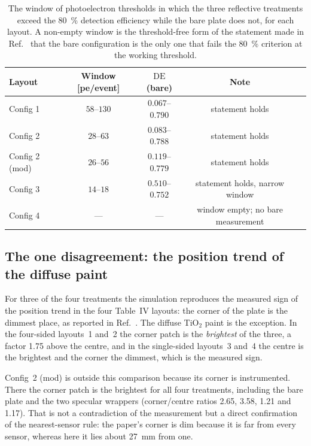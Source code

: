 \documentclass[11pt,a4paper]{article}
\begin{document}
\begin{table}[H]
\centering
\caption{The window of photoelectron thresholds in which the three reflective
treatments exceed the \SI{80}{\percent} detection efficiency while the bare
plate does not, for each layout. A non-empty window is the
threshold-free form of the statement made in Ref.~\cite{Rao2025} that the bare
configuration is the only one that fails the \SI{80}{\percent} criterion at the
working threshold.}
\label{tab:compareDE}
\small
{}
\begin{tabularx}{\textwidth}{@{}lcccY@{}}
\toprule
Layout & Window [pe/event] & $\mathrm{DE}$(bare) & Note \\
\midrule
Config 1 & $58$--$130$ & $0.067$--$0.790$ & statement holds \\
Config 2 & $28$--$63$  & $0.083$--$0.788$ & statement holds \\
Config 2 (mod) & $26$--$56$ & $0.119$--$0.779$ & statement holds \\
Config 3 & $14$--$18$  & $0.510$--$0.752$ & statement holds, narrow window \\
Config 4 & ---          & ---              & window empty; no bare measurement \\
\bottomrule
\end{tabularx}
\end{table}

\subsection{The one disagreement: the position trend of the diffuse paint}

For three of the four treatments the simulation reproduces the measured sign of
the position trend in the four Table~IV layouts: the corner of the plate is
the dimmest place, as reported in Ref.~\cite{Rao2025}. The diffuse TiO$_2$
paint is the exception. In the four-sided layouts~1 and~2 the corner patch is
the \emph{brightest} of the three, a factor \num{1.75} above the centre, and
in the single-sided layouts~3 and~4 the centre is the brightest and the corner
the dimmest, which is the measured sign.

Config~2 (mod) is outside this comparison because its corner is instrumented.
There the corner patch is the brightest for all four treatments, including the
bare plate and the two specular wrappers (corner/centre ratios \num{2.65},
\num{3.58}, \num{1.21} and \num{1.17}). That is not a contradiction of the
measurement but a direct confirmation of the nearest-sensor rule: the paper's
corner is dim because it is far from every sensor, whereas here it lies about
\SI{27}{\milli\meter} from one.
\end{document}
